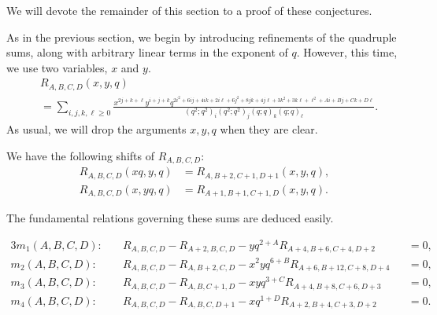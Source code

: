 We will devote the remainder of this section to a proof of these conjectures.

As in the previous section, we begin by introducing refinements of the quadruple sums, along with arbitrary linear terms in the exponent of $q$. However, this time, we use two variables, $x$ and $y$.
\begin{align}
\label{eqn:defR}
&R_{A,B,C,D}(x,y,q)\\
&= \sum_{i,j,k,\ell \ge 0}
\frac{x ^{2j + k + \ell } y ^{ i+j+k}q^{2i^2 + 6 ij + 4ik + 2i\ell + 6j^2 + 8 jk + 4 j\ell + 3k^2+3k\ell+\ell^2+Ai+Bj+Ck+D\ell}}
{\left(q^2;q^2\right)_i\left(q^2;q^2\right)_j\left(q;q\right)_k\left(q;q\right)_\ell}. \nonumber
\end{align}
As usual, we will drop the arguments $x,y,q$ when they are clear.

We have the following shifts of $R_{A,B,C,D}$:
\begin{align}
R_{A,B,C,D}(xq,y,q)&=R_{A,B+2,C+1,D+1}(x,y,q) \label{eqn:shiftRx},\\
R_{A,B,C,D}(x,yq,q)&=R_{A+1,B+1,C+1,D}(x,y,q) \label{eqn:shiftRy}.
\end{align}


The fundamental relations governing these sums are deduced easily.
\begin{prop}
\label{prop:mod10rels}
\begin{alignat}{3}
m_1(A,B,C,D):&\quad R_{A,B,C,D}-R_{A+2,B,C,D}-yq^{2+A}R_{A+4,B+6,C+4,D+2}&&=0 \label{eqn:relm1},\\
m_2(A,B,C,D):&\quad R_{A,B,C,D}-R_{A,B+2,C,D}-x^2yq^{6+B}R_{A+6,B+12,C+8,D+4}&&=0 \label{eqn:relm2},\\
m_3(A,B,C,D):&\quad R_{A,B,C,D}-R_{A,B,C+1,D}-xyq^{3+C}R_{A+4,B+8,C+6,D+3}&&=0 \label{eqn:relm3},\\
m_4(A,B,C,D):&\quad R_{A,B,C,D}-R_{A,B,C,D+1}-xq^{1+D}R_{A+2,B+4,C+3,D+2}&&=0 \label{eqn:relm4}.
\end{alignat}
\end{prop}


